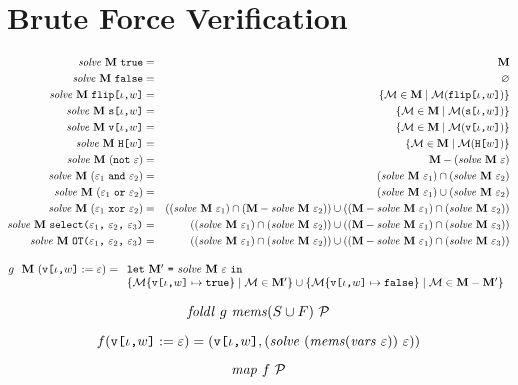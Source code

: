 \section{Brute Force Verification}
\label{section-bruteforce}

\begin{eqnarray*}
\solve{\stores}{\etrue} &=& \stores\\
\solve{\stores}{\efalse} &=& \varnothing\\
\solve{\stores}{\flip{\cid}{w}} &=& \{ \store \in \stores \mid \store(\flip{\cid}{w}) \} \\
\solve{\stores}{\secret{\cid}{w}} &=& \{ \store \in \stores \mid \store(\secret{\cid}{w}) \} \\
\solve{\stores}{\view{\cid}{w}} &=& \{ \store \in \stores \mid \store(\view{\cid}{w}) \} \\
\solve{\stores}{\oracle{w}} &=& \{ \store \in \stores \mid \store(\oracle{w}) \} \\
\solve{\stores}{(\enot\ \be)} &=& \stores - (\solve{\stores}{\be})\\
\solve{\stores}{(\be_1\ \eand\ \be_2)} &=& (\solve{\stores}{\be_1}) \cap (\solve{\stores}{\be_2}) \\
\solve{\stores}{(\be_1\ \eor\ \be_2)} &=& (\solve{\stores}{\be_1}) \cup (\solve{\stores}{\be_2}) \\
\solve{\stores}{(\be_1\ \exor\ \be_2)} &=&
 ((\solve{\stores}{\be_1}) \cap (\stores - \solve{\stores}{\be_2})) \cup
 ((\stores - \solve{\stores}{\be_1}) \cap (\solve{\stores}{\be_2})) \\
\solve{\stores}{\select{\be_1}{\be_2}{\be_3}} &=&
 ((\solve{\stores}{\be_1}) \cap (\solve{\stores}{\be_2})) \cup
 ((\stores - \solve{\stores}{\be_1}) \cap (\solve{\stores}{\be_3})) \\
\solve{\stores}{\OT{\be_1}{\be_2}{\be_3}} &=&
 ((\solve{\stores}{\be_1}) \cap (\solve{\stores}{\be_2})) \cup
 ((\stores - \solve{\stores}{\be_1}) \cap (\solve{\stores}{\be_3}))
\end{eqnarray*}


$$
g\ \ \stores\ (\eassign{\view{\cid}{w}}{\be}) =\begin{array}[t]{l}
\elet{\stores'}{\solve{\stores}{\be}}{}\\
  \{\extend{\store}{\view{\cid}{w}}{\etrue} \mid \store \in \stores' \} \cup
  \{\extend{\store}{\view{\cid}{w}}{\efalse} \mid \store \in \stores - \stores' \}\end{array}
$$

$$
\mathit{foldl}\ g\ \mems(S \cup F)\ \prog
$$

$$
f(\eassign{\view{\cid}{w}}{\be}) = (\view{\cid}{w}, (\solve{(\mems(\vars\ \be))}{\be}))
$$

$$
\mathit{map}\ f\ \prog
$$
